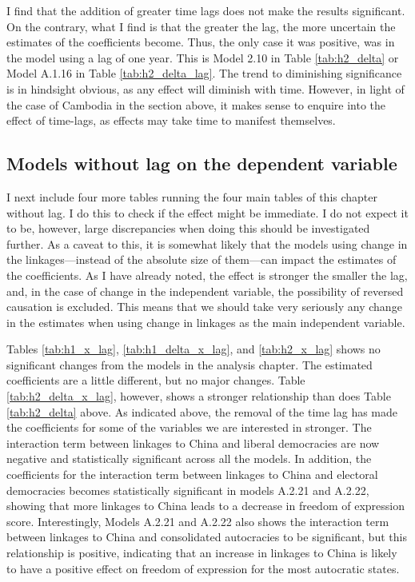 I find that the addition of greater time lags does not make the results significant. On the contrary, what I find is that the greater the lag, the more uncertain the estimates of the coefficients become. Thus, the only case it was positive, was in the model using a lag of one year. This is Model 2.10 in Table \ref{tab:h2_delta} or Model A.1.16 in Table \ref{tab:h2_delta_lag}. The trend to diminishing significance  is in hindsight obvious, as any effect will diminish with time. However, in light of the case of Cambodia in the section above, it makes sense to enquire into the effect of time-lags, as effects may take time to manifest themselves.

\subsection{Models without lag on the dependent variable}
I next include four more tables running the four main tables of this chapter without lag. I do this to check if the effect might be immediate. I do not expect it to be, however, large discrepancies when doing this should be investigated further. As a caveat to this, it is somewhat likely that the models using change in the linkages---instead of the absolute size of them---can impact the estimates of the coefficients. As I have already noted, the effect is stronger the smaller the lag, and, in the case of change in the independent variable, the possibility of reversed causation is excluded. This means that we should take very seriously any change in the estimates when using change in linkages as the main independent variable.

Tables \ref{tab:h1_x_lag}, \ref{tab:h1_delta_x_lag}, and \ref{tab:h2_x_lag} shows no significant changes from the models in the analysis chapter. The estimated coefficients are a little different, but no major changes. Table \ref{tab:h2_delta_x_lag}, however, shows a stronger relationship than does Table \ref{tab:h2_delta} above. As indicated above, the removal of the time lag has made the coefficients for some of the variables we are interested in stronger. The interaction term between linkages to China and liberal democracies are now negative and statistically significant across all the models. In addition, the coefficients for the interaction term between linkages to China and electoral democracies becomes statistically significant in models A.2.21 and A.2.22, showing that more linkages to China leads to a decrease in freedom of expression score. Interestingly, Models A.2.21 and A.2.22 also shows the interaction term between linkages to China and consolidated autocracies to be significant, but this relationship is positive, indicating that an increase in linkages to China is likely to have a positive effect on freedom of expression for the most autocratic states.

